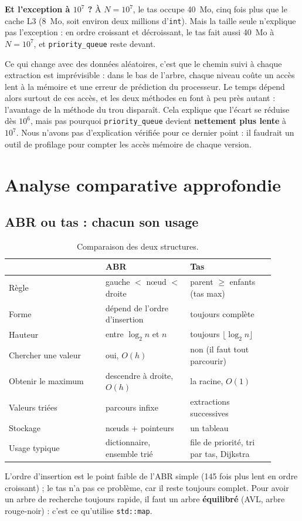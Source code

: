 \documentclass[12pt,a4paper]{report}
\begin{document}
\textbf{Et l'exception à $10^7$ ?} À $N=10^7$, le tas occupe 40~Mo, cinq fois plus que le cache L3 (8~Mo, soit environ deux millions d'\texttt{int}). Mais la taille seule n'explique pas l'exception : en ordre croissant et décroissant, le tas fait aussi 40~Mo à $N=10^7$, et \texttt{priority\_queue} reste devant.

Ce qui change avec des données aléatoires, c'est que le chemin suivi à chaque extraction est imprévisible : dans le bas de l'arbre, chaque niveau coûte un accès lent à la mémoire et une erreur de prédiction du processeur. Le temps dépend alors surtout de ces accès, et les deux méthodes en font à peu près autant : l'avantage de la méthode du trou disparaît. Cela explique que l'écart se réduise dès $10^6$, mais pas pourquoi \texttt{priority\_queue} devient \textbf{nettement plus lente} à $10^7$. Nous n'avons pas d'explication vérifiée pour ce dernier point : il faudrait un outil de profilage pour compter les accès mémoire de chaque version.

\chapter{Analyse comparative approfondie}

\section{ABR ou tas : chacun son usage}
\begin{table}[H]
\centering
\caption{Comparaison des deux structures.}
\begin{tabular}{p{0.32\linewidth}p{0.29\linewidth}p{0.29\linewidth}}
  \toprule
  & ABR & Tas \\
  \midrule
  Règle & gauche $<$ nœud $<$ droite & parent $\geq$ enfants (tas max) \\
  Forme & dépend de l'ordre d'insertion & toujours complète \\
  Hauteur & entre $\log_2 n$ et $n$ & toujours $\lfloor\log_2 n\rfloor$ \\
  Chercher une valeur & oui, $O(h)$ & non (il faut tout parcourir) \\
  Obtenir le maximum & descendre à droite, $O(h)$ & la racine, $O(1)$ \\
  Valeurs triées & parcours infixe & extractions successives \\
  Stockage & nœuds + pointeurs & un tableau \\
  Usage typique & dictionnaire, ensemble trié & file de priorité, tri par tas, Dijkstra \\
  \bottomrule
\end{tabular}
\end{table}
L'ordre d'insertion est le point faible de l'ABR simple (145 fois plus lent en ordre croissant) ; le tas n'a pas ce problème, car il reste toujours complet. Pour avoir un arbre de recherche toujours rapide, il faut un arbre \textbf{équilibré} (AVL, arbre rouge-noir) : c'est ce qu'utilise \texttt{std::map}.
\end{document}
